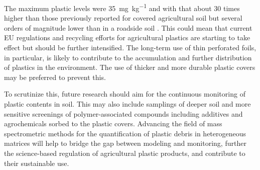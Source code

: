 The maximum plastic levels were \SI{35}{\milli\gram\per\kilo\gram} and with that about 30 times higher than those previously reported for covered agricultural soil \citep{BuksGlobal2020} but several orders of magnitude lower than in a roadside soil \citep{DierkesQuantification2019}. This could mean that current EU regulations \citep{EN13655Plastics2018} and recycling efforts for agricultural plastics are starting to take effect but should be further intensified. The long-term use of thin perforated foils, in particular, is likely to contribute to the accumulation and further distribution of plastics in the environment. The use of thicker and more durable plastic covers may be preferred to prevent this.

To scrutinize this, future research should aim for the continuous monitoring of plastic contents in soil. This may also include samplings of deeper soil and more sensitive screenings of polymer-associated compounds including additives and agrochemicals sorbed to the plastic covers.
Advancing the field of mass spectrometric methods for the quantification of plastic debris in heterogeneous matrices will help to bridge the gap between modeling and monitoring, further the science-based regulation of agricultural plastic products, and contribute to their sustainable use.
